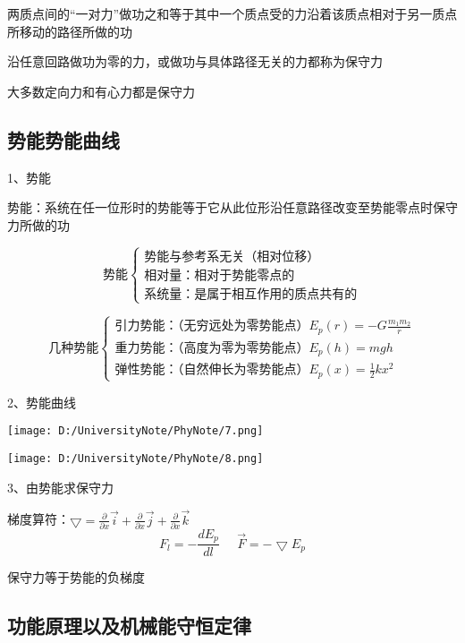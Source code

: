 \documentclass[UTF8]{article}
\begin{document}
    两质点间的“一对力”做功之和等于其中一个质点受的力沿着该质点相对于另一质点所移动的路径所做的功

    沿任意回路做功为零的力，或做功与具体路径无关的力都称为保守力

    大多数定向力和有心力都是保守力

\subsection{势能\;\;势能曲线}

    1、势能

    势能：系统在任一位形时的势能等于它从此位形沿任意路径改变至势能零点时保守力所做的功

    \[\mbox{势能}\left\{
        \begin{aligned}
        \mbox{势能与参考系无关（相对位移）     } \\
        \mbox{相对量：相对于势能零点的         } \\
        \mbox{系统量：是属于相互作用的质点共有的}
        \end{aligned}
        \right.\]
    
    \[\mbox{几种势能}\left\{
        \begin{aligned}
        \mbox{引力势能：（无穷远处为零势能点）} E_p(r) = -G\frac{m_1m_2}{r}\\
        \mbox{重力势能：（高度为零为零势能点）} E_p(h) = mgh\\
        \mbox{弹性势能：（自然伸长为零势能点）} E_p(x) = \frac{1}{2}kx^2
        \end{aligned}
        \right.\]
    
    2、势能曲线

    \texttt{[image: D:/UniversityNote/PhyNote/7.png]}
    
    \texttt{[image: D:/UniversityNote/PhyNote/8.png]}

    3、由势能求保守力

    梯度算符：$\bigtriangledown = \frac{\partial}{\partial x}\vec{i} + \frac{\partial}{\partial x}\vec{j} + \frac{\partial}{\partial x}\vec{k}$
    \[F_l = -\frac{dE_p}{dl}\;\;\;\;\;\vec{F} = -\bigtriangledown E_p\]

    保守力等于势能的负梯度

\subsection{功能原理以及机械能守恒定律}
\end{document}

